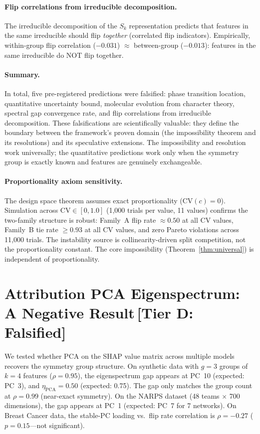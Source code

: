 \documentclass[11pt,a4paper]{article}
\begin{document}
\paragraph{Flip correlations from irreducible decomposition.}
The irreducible decomposition of the $S_k$ representation predicts that
features in the same irreducible should flip \emph{together} (correlated
flip indicators).  Empirically, within-group flip correlation ($-0.031$)
$\approx$ between-group ($-0.013$): features in the same irreducible do NOT
flip together.

\paragraph{Summary.}
In total, five pre-registered predictions were falsified: phase transition
location, quantitative uncertainty bound, molecular evolution from character
theory, spectral gap convergence rate, and flip correlations from irreducible
decomposition.  These falsifications are scientifically valuable: they define
the boundary between the framework's proven domain (the impossibility theorem
and its resolutions) and its speculative extensions.  The impossibility and
resolution work universally; the quantitative predictions work only when the
symmetry group is exactly known and features are genuinely exchangeable.

\paragraph{Proportionality axiom sensitivity.}
The design space theorem assumes exact proportionality ($\text{CV}(c) = 0$). Simulation across $\text{CV} \in [0, 1.0]$ (1{,}000 trials per value, 11 values) confirms the two-family structure is robust: Family~A flip rate $\approx 0.50$ at all CV values, Family~B tie rate $\geq 0.93$ at all CV values, and zero Pareto violations across 11{,}000 trials. The instability source is collinearity-driven split competition, not the proportionality constant. The core impossibility (Theorem~\ref{thm:universal}) is independent of proportionality.

\section{Attribution PCA Eigenspectrum: A Negative Result\,\textnormal{\normalsize[Tier D: Falsified]}}
\label{sec:attribution-pca}

We tested whether PCA on the SHAP value matrix across multiple models recovers the symmetry group structure.  On synthetic data with $g = 3$ groups of $k = 4$ features ($\rho = 0.95$), the eigenspectrum gap appears at PC~10 (expected: PC~3), and $\eta_{\text{PCA}} = 0.50$ (expected: 0.75).  The gap only matches the group count at $\rho = 0.99$ (near-exact symmetry).  On the NARPS dataset (48 teams $\times$ 700 dimensions), the gap appears at PC~1 (expected: PC~7 for 7 networks).  On Breast Cancer data, the stable-PC loading vs.\ flip rate correlation is $\rho = -0.27$ ($p = 0.15$---not significant).
\end{document}
